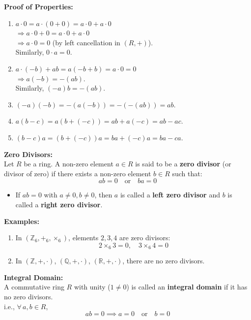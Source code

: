 \documentclass[11pt]{article}
\begin{document}
\newpage
\noindent \textbf{Proof of Properties:}
\begin{enumerate}
    \item $a \cdot 0 = a \cdot (0 + 0) = a \cdot 0 + a \cdot 0$ \\
    $\Rightarrow a \cdot 0 + 0 = a \cdot 0 + a \cdot 0$ \\
    $\Rightarrow a \cdot 0 = 0$ (by left cancellation in $(R, +)$). \\
    Similarly, $0 \cdot a = 0$.

    \item $a \cdot (-b) + ab = a(-b + b) = a \cdot 0 = 0$ \\
    $\Rightarrow a(-b) = -(ab)$. \\
    Similarly, $(-a)b = -(ab)$.

    \item $(-a)(-b) = -(a(-b)) = -(-(ab)) = ab$.

    \item $a(b - c) = a(b + (-c)) = ab + a(-c) = ab - ac$.

    \item $(b - c)a = (b + (-c))a = ba + (-c)a = ba - ca$.
\end{enumerate}

\bigskip
\noindent \textbf{Zero Divisors:} \\
Let $R$ be a ring. A non-zero element $a \in R$ is said to be a \textbf{zero divisor} (or divisor of zero) if there exists a non-zero element $b \in R$ such that:
\[
ab = 0 \quad \text{or} \quad ba = 0
\]
\begin{itemize}
    \item If $ab = 0$ with $a \ne 0, b \ne 0$, then $a$ is called a \textbf{left zero divisor} and $b$ is called a \textbf{right zero divisor}.
\end{itemize}

\bigskip
\noindent \textbf{Examples:}
\begin{enumerate}
    \item In $(\mathbb{Z}_6, +_6, \times_6)$, elements $2, 3, 4$ are zero divisors:
    \[
    2 \times_6 3 = 0, \quad 3 \times_6 4 = 0
    \]
    \item In $(\mathbb{Z}, +, \cdot)$, $(\mathbb{Q}, +, \cdot)$, $(\mathbb{R}, +, \cdot)$, there are no zero divisors.
\end{enumerate}

\newpage
\noindent \textbf{Integral Domain:} \\
A commutative ring $R$ with unity ($1 \ne 0$) is called an \textbf{integral domain} if it has no zero divisors. \\
i.e., $\forall\, a, b \in R$,
\[
ab = 0 \implies a = 0 \quad \text{or} \quad b = 0
\]
\end{document}
